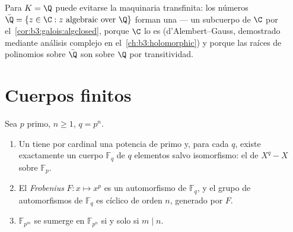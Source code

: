 \begin{remark}\label{rem:b3:galois:closureexamples}
Para $K = \Q$ puede evitarse la maquinaria transfinita: los números
$\bar\Q = \{z \in \C : z \text{ algebraic over
} \Q\}$ forman una 
--- un subcuerpo de $\C$ por el~\cref{cor:b3:galois:algclosed},
 porque $\C$ lo
es (d'Alembert--Gauss, demostrado mediante análisis complejo en
el~\cref{ch:b3:holomorphic}) y porque las raíces de polinomios sobre
$\bar\Q$ son  sobre $\Q$
por transitividad.
\end{remark}

\section{Cuerpos finitos}

\begin{theorem}\label{thm:b3:galois:finitefields}
Sea $p$ primo, $n \geq 1$, $q = p^n$.
\begin{enumerate}
  \item Un  tiene por
  cardinal una potencia de primo y, para cada $q$, existe exactamente un
  cuerpo $\mathbb F_q$ de $q$ elementos salvo isomorfismo: el
   de
  $X^q - X$ sobre $\mathbb F_p$. \item El
  \emph{Frobenius} $F
        \colon x \mapsto x^p$ es un automorfismo de $\mathbb
        F_q$, y el grupo de automorfismos de $\mathbb F_q$ es cíclico de
  orden $n$, generado por $F$. \item $\mathbb F_{p^m}$ se sumerge en
  $\mathbb F_{p^n}$ si y solo si $m \mid
        n$.
\end{enumerate}
\end{theorem}

